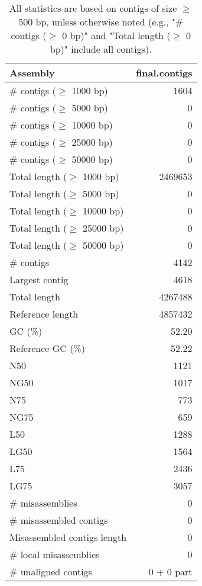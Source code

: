 \documentclass[12pt,a4paper]{article}
\begin{document}
\begin{table}[ht]
\begin{center}
\caption{All statistics are based on contigs of size $\geq$ 500 bp, unless otherwise noted (e.g., "\# contigs ($\geq$ 0 bp)" and "Total length ($\geq$ 0 bp)" include all contigs).}
\begin{tabular}{|l*{1}{|r}|}
\hline
Assembly & final.contigs \\ \hline
\# contigs ($\geq$ 1000 bp) & 1604 \\ \hline
\# contigs ($\geq$ 5000 bp) & 0 \\ \hline
\# contigs ($\geq$ 10000 bp) & 0 \\ \hline
\# contigs ($\geq$ 25000 bp) & 0 \\ \hline
\# contigs ($\geq$ 50000 bp) & 0 \\ \hline
Total length ($\geq$ 1000 bp) & 2469653 \\ \hline
Total length ($\geq$ 5000 bp) & 0 \\ \hline
Total length ($\geq$ 10000 bp) & 0 \\ \hline
Total length ($\geq$ 25000 bp) & 0 \\ \hline
Total length ($\geq$ 50000 bp) & 0 \\ \hline
\# contigs & 4142 \\ \hline
Largest contig & 4618 \\ \hline
Total length & 4267488 \\ \hline
Reference length & 4857432 \\ \hline
GC (\%) & 52.20 \\ \hline
Reference GC (\%) & 52.22 \\ \hline
N50 & 1121 \\ \hline
NG50 & 1017 \\ \hline
N75 & 773 \\ \hline
NG75 & 659 \\ \hline
L50 & 1288 \\ \hline
LG50 & 1564 \\ \hline
L75 & 2436 \\ \hline
LG75 & 3057 \\ \hline
\# misassemblies & 0 \\ \hline
\# misassembled contigs & 0 \\ \hline
Misassembled contigs length & 0 \\ \hline
\# local misassemblies & 0 \\ \hline
\# unaligned contigs & 0 + 0 part \\ \hline

\end{tabular}
\end{center}
\end{table}
\end{document}
